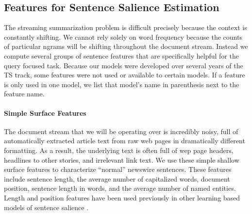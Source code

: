 %

\subsection{Features for Sentence Salience Estimation}
\label{sec:features}

The streaming summarization problem is difficult precisely because the context
is constantly shifting. We cannot rely solely on word frequency because
the counts of particular ngrams will be shifting throughout the document
stream. Instead we compute several groups of sentence features that are
specifically helpful for the query focused task. Because our models were
developed over several years of the TS track, some
features were not used or available to certain models. If a feature
is only used in one model, we list that model's name in parenthesis next
to the feature name.



\paragraph{Simple Surface Features} 

The document stream that we will be operating over is incredibly noisy,
full of automatically extracted article text from raw web pages in 
dramatically different formatting. As a result, the underlying text is often
full of wep page headers, headlines to other stories, and irrelevant link text.
We use these simple shallow surface features to characterize 
``normal'' newswire sentences.
These features 
include sentence length, the average number of capitalized words,
document position, sentence length in words, and the average number of 
named entities. Length and position features have been used previously in
other learning based models of sentence salience
\citep{kupiec1995trainable,conroy2001using}.

